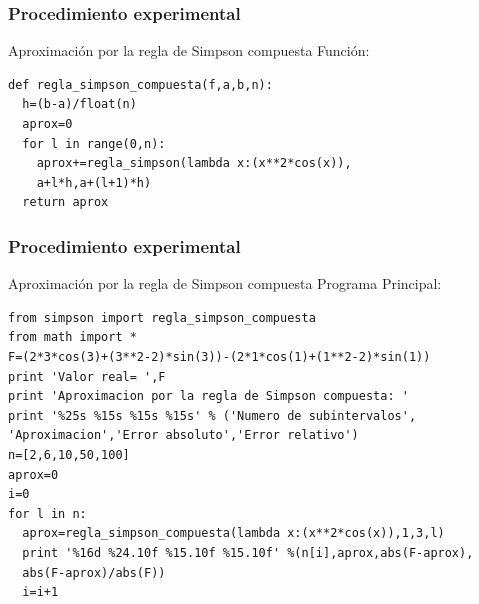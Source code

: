 \documentclass{beamer}
\begin{document}
\begin{frame}[fragile]

  \frametitle{Procedimiento experimental}
  
  \begin{block}{Aproximación por la regla de Simpson compuesta}
    Función:
    \begin{center}
      \begin{footnotesize}
        \begin{verbatim}
def regla_simpson_compuesta(f,a,b,n):
  h=(b-a)/float(n)
  aprox=0
  for l in range(0,n):
    aprox+=regla_simpson(lambda x:(x**2*cos(x)),
    a+l*h,a+(l+1)*h)
  return aprox
        \end{verbatim}
      \end{footnotesize}
    \end{center}
  \end{block}
  
\end{frame}
\begin{frame}[fragile]

  \frametitle{Procedimiento experimental}
  
  \begin{block}{Aproximación por la regla de Simpson compuesta}
    Programa Principal:
    \begin{center}
      \begin{footnotesize}
        \begin{verbatim}
from simpson import regla_simpson_compuesta
from math import *
F=(2*3*cos(3)+(3**2-2)*sin(3))-(2*1*cos(1)+(1**2-2)*sin(1))
print 'Valor real= ',F
print 'Aproximacion por la regla de Simpson compuesta: '
print '%25s %15s %15s %15s' % ('Numero de subintervalos',
'Aproximacion','Error absoluto','Error relativo')
n=[2,6,10,50,100]
aprox=0
i=0
for l in n:
  aprox=regla_simpson_compuesta(lambda x:(x**2*cos(x)),1,3,l)
  print '%16d %24.10f %15.10f %15.10f' %(n[i],aprox,abs(F-aprox),
  abs(F-aprox)/abs(F))
  i=i+1
        \end{verbatim}
      \end{footnotesize}
    \end{center}
  \end{block}
  
\end{frame}
\end{document}
